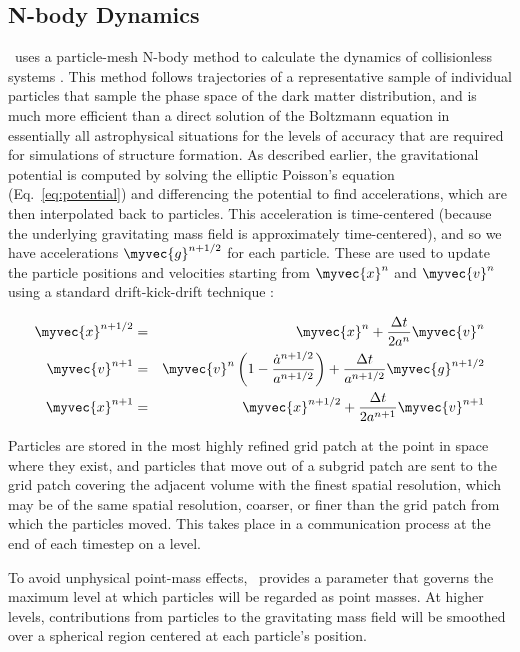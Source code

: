 \subsection{N-body Dynamics}
\label{sec.ov.nbody}

\enzo\ uses a particle-mesh N-body method to calculate the dynamics of
collisionless systems \citep{Hockney88}.  This method follows
trajectories of a representative sample of individual particles that
sample the phase space of the dark matter distribution, and is much
more efficient than a direct solution of the Boltzmann equation in
essentially all astrophysical situations for the levels of accuracy
that are required for simulations of structure formation.  As
described earlier, the gravitational potential is computed by solving
the elliptic Poisson's equation (Eq.~\ref{eq:potential}) and
differencing the potential to find accelerations, which are then
interpolated back to particles.  This acceleration is time-centered
(because the underlying gravitating mass field is approximately
time-centered), and so we have accelerations $\myvec{g}^{n+1/2}$ for
each particle.  These are used to update the particle positions and
velocities starting from $\myvec{x}^n$ and $\myvec{v}^n$ using a
standard drift-kick-drift technique \citep{Hockney88}:

\begin{eqnarray}
\label{eqn.driftkick}
\myvec{x}^{n+1/2} & = & \myvec{x}^n + \frac{\Delta t}{2 a^n} \myvec{v}^{n} \nonumber \\
\myvec{v}^{n+1} & = & \myvec{v}^n \left(1 - \frac{\dot{a}^{n+1/2}}{a^{n+1/2}}\right) + \frac{\Delta t}{ a^{n+1/2}} \myvec{g}^{n+1/2} \\
\myvec{x}^{n+1} & = & \myvec{x}^{n+1/2} + \frac{\Delta t}{2 a^{n+1}} \myvec{v}^{n+1} \nonumber
\end{eqnarray}

Particles are stored in the most highly refined grid patch at the
point in space where they exist, and particles that move out of a
subgrid patch are sent to the grid patch covering the adjacent volume
with the finest spatial resolution, which may be of the same spatial
resolution, coarser, or finer than the grid patch from which the
particles moved.  This takes place in a communication process at the
end of each timestep on a level.

To avoid unphysical point-mass effects, \enzo\ provides a parameter
that governs the maximum level at which particles will be regarded as
point masses.  At higher levels, contributions from particles to the
gravitating mass field will be smoothed over a spherical region
centered at each particle's position.